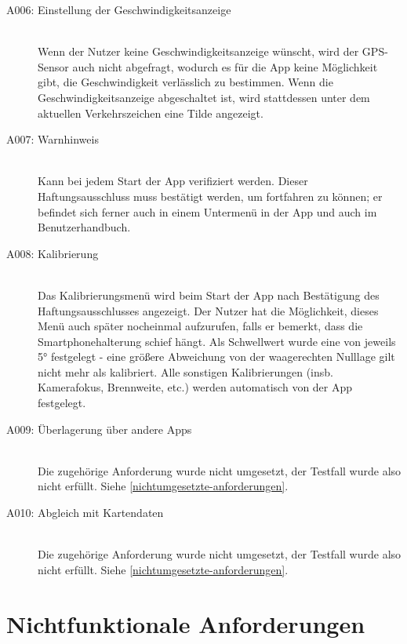 \documentclass[12pt,a4paper,ngerman,enabledeprecatedfontcommands]{scrreprt}
\begin{document}
\begin{description}
    \item[A006: Einstellung der Geschwindigkeitsanzeige]~\\ Wenn der \gls{Nutzer} keine Geschwindigkeitsanzeige wünscht, wird der GPS-Sensor auch nicht abgefragt, wodurch es für die \gls{App} keine Möglichkeit gibt, die Geschwindigkeit verlässlich zu bestimmen. Wenn die Geschwindigkeitsanzeige abgeschaltet ist, wird stattdessen unter dem aktuellen Verkehrszeichen eine Tilde angezeigt.
    
    \item[A007: Warnhinweis]~\\ Kann bei jedem Start der \gls{App} verifiziert werden. Dieser Haftungsausschluss muss bestätigt werden, um fortfahren zu können; er befindet sich ferner auch in einem Untermenü in der \gls{App} und auch im Benutzerhandbuch.
    
    \item[A008: Kalibrierung]~\\ Das Kalibrierungsmenü wird beim Start der App nach Bestätigung des Haftungsausschlusses angezeigt. Der \gls{Nutzer} hat die Möglichkeit, dieses Menü auch später nocheinmal aufzurufen, falls er bemerkt, dass die Smartphonehalterung schief hängt. Als Schwellwert wurde eine  von jeweils 5° festgelegt - eine größere Abweichung von der waagerechten Nulllage gilt nicht mehr als kalibriert. Alle sonstigen Kalibrierungen (insb. Kamerafokus, Brennweite, etc.) werden automatisch von der \gls{App} festgelegt.
    
    \item[A009: Überlagerung über andere Apps]~\\ Die zugehörige Anforderung wurde nicht umgesetzt, der Testfall wurde also nicht erfüllt. Siehe \cref{nichtumgesetzte-anforderungen}. 
    
    \item[A010: Abgleich mit Kartendaten]~\\ Die zugehörige Anforderung wurde nicht umgesetzt, der Testfall wurde also nicht erfüllt. Siehe \cref{nichtumgesetzte-anforderungen}. 
    
\end{description}
\smallskip

\section{Nichtfunktionale Anforderungen}
\end{document}
